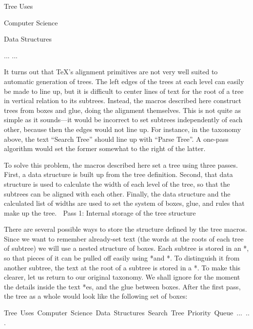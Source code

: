 \vb
\tree
  Tree
  Uses

  \subtree
    Computer
    Science

    \subtree
      Data
      Structures

    \endsubtree
    ...
  \endsubtree
  ...
\endtree
\endvb

It turns out that \TeX's alignment primitives are not very well suited to
automatic generation of trees.  The left edges of the trees at each
level can easily be made to line up, but it is difficult to center
lines of text for the root of a tree in vertical relation to its subtrees.
Instead, the macros described here construct trees from boxes and
glue, doing the alignment themselves.  This is not quite as simple as
it sounds---it would be incorrect to set subtrees independently of
each other, because then the edges would not line up.  For instance,
in the taxonomy above, the text ``Search Tree'' should line up
with ``Parse Tree''.  A one-pass algorithm would set the former
somewhat to the right of the latter.

To solve this problem, the macros described here set a tree using
three passes.  First, a data structure is built up from the tree
definition.  Second, that data structure is used to calculate the
width of each level of the tree, so that the subtrees can be aligned with each
other.  Finally, the data structure and the calculated list of widths
are used to set the system of boxes, glue, and rules that make up the tree.

\beginsection Pass 1: Internal storage of the tree structure

There are several possible ways to store the structure defined by the
tree macros.  Since we want to remember already-set text (the words at
the roots of each tree of subtree) we will use a nested structure of boxes.
Each subtree is stored in an *\hbox*, so that pieces of it can be pulled
off easily using *\lastbox* and *\unskip*.  To distinguish it from
another subtree, the text at the root of a subtree is stored in a *\vbox*.
To make this clearer, let us return to our original taxonomy.
We shall ignore for the moment
the details inside the text *\vbox*es, and the glue between boxes.
After the first pass, the tree as a whole would look like the
following set of boxes:

\vb
\hbox{\vbox{Tree Uses}
  \hbox{\vbox{Computer Science}
    \hbox{\vbox{Data Structures}
      \hbox{\vbox{Search Tree}}
      \hbox{\vbox{Priority Queue}}}
    ...}
  ...}
\endvb

